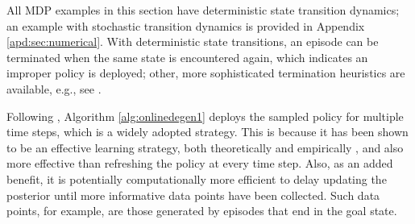 \documentclass{amsart}
\begin{document}
All MDP examples in this section have deterministic state transition dynamics; an example with stochastic transition dynamics is provided in Appendix \ref{apd:sec:numerical}. With deterministic state transitions, an episode can be terminated when the same state is encountered again, which indicates an improper policy is deployed; other, more sophisticated termination heuristics are available, e.g., see \citet{ucrl2regret,psrlinfhorizon,bayesoptiamlpolicy,psrl-ssp}.

Following \citet{tsstren}, Algorithm \ref{alg:onlinedegen1} deploys the sampled policy for multiple time steps, which is a widely adopted strategy. This is because it has been shown to be an effective learning strategy, both theoretically and empirically \citep{osband2013moreefficient,bootstraposband,randomisedpriorwithensembleosband,randomisedvaluefunction,psrlinfhorizon}, and also more effective than refreshing the policy at every time step. Also, as an added benefit, it is potentially computationally more efficient to delay updating the posterior until more informative data points have been collected. Such data points, for example, are those generated by episodes that end in the goal state.
\end{document}
